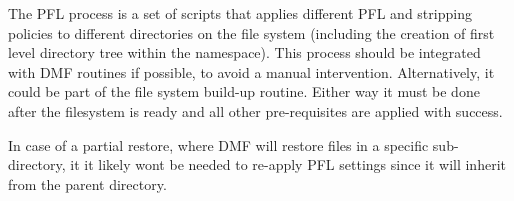 \documentclass{article}
\begin{document}
The PFL process is a set of scripts that applies different PFL and stripping policies to different directories on the file system (including the creation of first level directory tree within the namespace). This process should be integrated with DMF routines if possible, to avoid a manual intervention. Alternatively, it could be part of the file system build-up routine. Either way it must be done after the filesystem is ready and all other pre-requisites are applied with success.

In case of a partial restore, where DMF will restore files in a specific sub-directory, it it likely wont be needed to re-apply PFL settings since it will inherit from the parent directory. 
\end{document}
